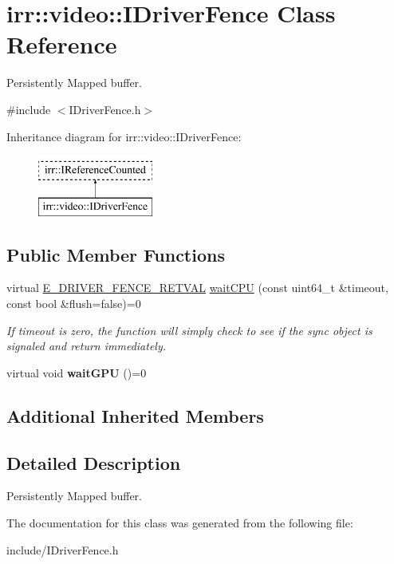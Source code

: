 \hypertarget{classirr_1_1video_1_1IDriverFence}{}\section{irr\+:\+:video\+:\+:I\+Driver\+Fence Class Reference}
\label{classirr_1_1video_1_1IDriverFence}


Persistently Mapped buffer.  




{\ttfamily \#include $<$I\+Driver\+Fence.\+h$>$}

Inheritance diagram for irr\+:\+:video\+:\+:I\+Driver\+Fence\+:\begin{figure}[H]
\begin{center}
\leavevmode
\includegraphics[height=2.000000cm]{classirr_1_1video_1_1IDriverFence}
\end{center}
\end{figure}
\subsection*{Public Member Functions}
\begin{DoxyCompactItemize}
\item 
virtual \hyperlink{namespaceirr_1_1video_ae93020af22218bae203c7bb52b87590b}{E\+\_\+\+D\+R\+I\+V\+E\+R\+\_\+\+F\+E\+N\+C\+E\+\_\+\+R\+E\+T\+V\+AL} \hyperlink{classirr_1_1video_1_1IDriverFence_a6071037e9963ecd4fa550a5cadb75a74}{wait\+C\+PU} (const uint64\+\_\+t \&timeout, const bool \&flush=false)=0\hypertarget{classirr_1_1video_1_1IDriverFence_a6071037e9963ecd4fa550a5cadb75a74}{}\label{classirr_1_1video_1_1IDriverFence_a6071037e9963ecd4fa550a5cadb75a74}

\begin{DoxyCompactList}\small\item\em If timeout​ is zero, the function will simply check to see if the sync object is signaled and return immediately. \end{DoxyCompactList}\item 
virtual void {\bfseries wait\+G\+PU} ()=0\hypertarget{classirr_1_1video_1_1IDriverFence_af976db482d86248df380d15a8ba2972e}{}\label{classirr_1_1video_1_1IDriverFence_af976db482d86248df380d15a8ba2972e}

\end{DoxyCompactItemize}
\subsection*{Additional Inherited Members}


\subsection{Detailed Description}
Persistently Mapped buffer. 

The documentation for this class was generated from the following file\+:\begin{DoxyCompactItemize}
\item 
include/I\+Driver\+Fence.\+h\end{DoxyCompactItemize}
